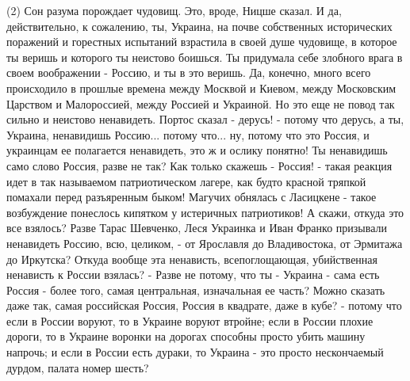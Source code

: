 (2) Сон разума порождает чудовищ. Это, вроде, Ницше сказал. И да,
действительно, к сожалению, ты, Украина, на почве собственных исторических
поражений и горестных испытаний взрастила в своей душе чудовище, в которое ты
веришь и которого ты неистово боишься. Ты придумала себе злобного врага в своем
воображении - Россию, и ты в это веришь. Да, конечно, много всего происходило в
прошлые времена между Москвой и Киевом, между Московским Царством и
Малороссией, между Россией и Украиной.  Но это еще не повод так сильно и
неистово ненавидеть. Портос сказал - дерусь! - потому что дерусь, а ты,
Украина, ненавидишь Россию... потому что... ну, потому что это Россия, и
украинцам ее полагается ненавидеть, это ж и ослику понятно! Ты ненавидишь само
слово Россия, разве не так? Как только скажешь - Россия! - такая реакция идет в
так называемом патриотическом лагере, как будто красной тряпкой помахали перед
разъяренным быком! Магучих обнялась с Ласицкене - такое возбуждение понеслось
кипятком у истеричных патриотиков! А скажи, откуда это все взялось? Разве Тарас
Шевченко, Леся Украинка и Иван Франко призывали ненавидеть Россию, всю,
целиком, - от Ярославля до Владивостока, от Эрмитажа до Иркутска? Откуда вообще
эта ненависть, всепоглощающая, убийственная ненависть к России взялась? - Разве
не потому, что ты - Украина - сама есть Россия - более того, самая центральная,
изначальная ее часть? Можно сказать даже так, самая российская Россия, Россия в
квадрате, даже в кубе? - потому что если в России воруют, то в Украине воруют
втройне; если в России плохие дороги, то в Украине воронки на дорогах способны
просто убить машину напрочь; и если в России есть дураки, то Украина - это
просто нескончаемый дурдом, палата номер шесть?

